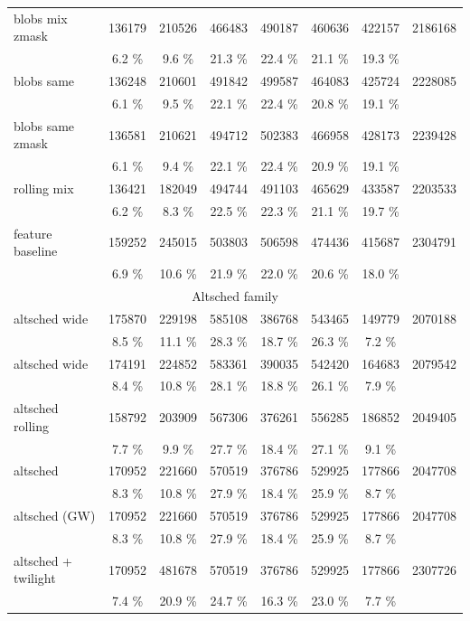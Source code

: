 \documentclass [11pt,a4paper]{article}
\begin{document}
\begin{appendices}
\begin{longtable}{l|ccccccc}
\hline
     blobs mix zmask &  136179 &  210526 &  466483 &  490187 &  460636 &  422157 &  2186168 \\ 
                     &    6.2 \% &    9.6 \% &   21.3 \% &   22.4 \% &   21.1 \% &   19.3 \% & \\
\hline
          blobs same &  136248 &  210601 &  491842 &  499587 &  464083 &  425724 &  2228085 \\ 
                     &    6.1 \% &    9.5 \% &   22.1 \% &   22.4 \% &   20.8 \% &   19.1 \% & \\
\hline
    blobs same zmask &  136581 &  210621 &  494712 &  502383 &  466958 &  428173 &  2239428 \\ 
                     &    6.1 \% &    9.4 \% &   22.1 \% &   22.4 \% &   20.9 \% &   19.1 \% & \\
\hline
         rolling mix &  136421 &  182049 &  494744 &  491103 &  465629 &  433587 &  2203533 \\ 
                     &    6.2 \% &    8.3 \% &   22.5 \% &   22.3 \% &   21.1 \% &   19.7 \% & \\
\hline
    feature baseline &  159252 &  245015 &  503803 &  506598 &  474436 &  415687 &  2304791 \\ 
                     &    6.9 \% &   10.6 \% &   21.9 \% &   22.0 \% &   20.6 \% &   18.0 \% & \\
\hline
\hline
\multicolumn{8}{c}{Altsched family}\\
\hline
       altsched wide &  175870 &  229198 &  585108 &  386768 &  543465 &  149779 &  2070188 \\ 
                     &    8.5 \% &   11.1 \% &   28.3 \% &   18.7 \% &   26.3 \% &    7.2 \% & \\
\hline
       altsched wide &  174191 &  224852 &  583361 &  390035 &  542420 &  164683 &  2079542 \\ 
                     &    8.4 \% &   10.8 \% &   28.1 \% &   18.8 \% &   26.1 \% &    7.9 \% & \\
       \hline
    altsched rolling &  158792 &  203909 &  567306 &  376261 &  556285 &  186852 &  2049405 \\ 
                     &    7.7 \% &    9.9 \% &   27.7 \% &   18.4 \% &   27.1 \% &    9.1 \% & \\
\hline
            altsched &  170952 &  221660 &  570519 &  376786 &  529925 &  177866 &  2047708 \\ 
                     &    8.3 \% &   10.8 \% &   27.9 \% &   18.4 \% &   25.9 \% &    8.7 \% & \\
\hline
       altsched (GW) &  170952 &  221660 &  570519 &  376786 &  529925 &  177866 &  2047708 \\ 
                     &    8.3 \% &   10.8 \% &   27.9 \% &   18.4 \% &   25.9 \% &    8.7 \% & \\
\hline
 altsched + twilight &  170952 &  481678 &  570519 &  376786 &  529925 &  177866 &  2307726 \\ 
                     &    7.4 \% &   20.9 \% &   24.7 \% &   16.3 \% &   23.0 \% &    7.7 \% & \\


\end{longtable}
\end{appendices}
\end{document}
